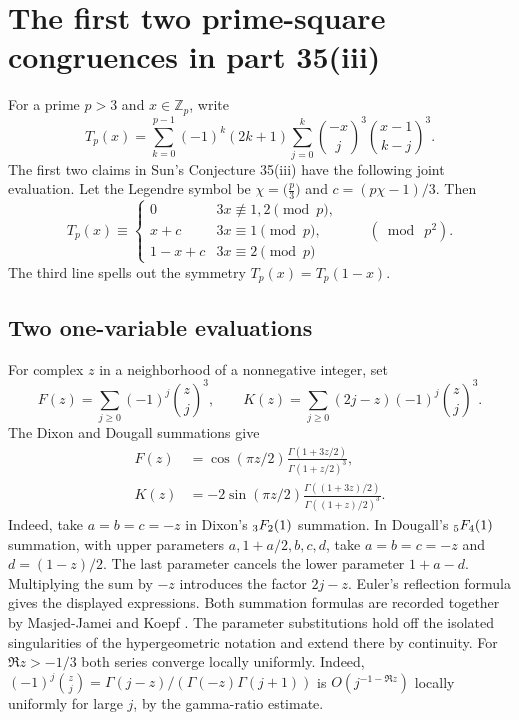 \documentclass[11pt,a4paper]{article}
\theoremstyle{definition}\newtheorem{problem}[theorem]{Auxiliary problem}
\theoremstyle{remark}\newtheorem*{remark}{Remark}
\begin{document}
\section{The first two prime-square congruences in part 35(iii)}
\label{sec:cubicprime}
For a prime $p>3$ and $x\in\mathbb Z_p$, write
\[
 T_p(x)=\sum_{k=0}^{p-1}(-1)^k(2k+1)
        \sum_{j=0}^{k}\binom{-x}{j}^{3}\binom{x-1}{k-j}^{3}.
\]
The first two claims in Sun's Conjecture 35(iii) have the following joint evaluation.
Let the Legendre symbol be $\chi=\bigl(\frac{p}{3}\bigr)$ and $c=(p\chi-1)/3$. Then
\begin{equation}\label{eq:cubic-sun-eval}
 T_p(x)\equiv
 \begin{cases}
   0 & 3x\not\equiv 1,2\pmod p,\\
   x+c & 3x\equiv1\pmod p,\\
   1-x+c & 3x\equiv2\pmod p
 \end{cases}
 \qquad (\bmod\ p^2).
\end{equation}
The third line spells out the symmetry $T_p(x)=T_p(1-x)$.

\subsection*{Two one-variable evaluations}
For complex $z$ in a neighborhood of a nonnegative integer, set
\[
 F(z)=\sum_{j\geq0}(-1)^j\binom zj^3,\qquad
 K(z)=\sum_{j\geq0}(2j-z)(-1)^j\binom zj^3.
\]
The Dixon and Dougall summations give
\begin{align}
 F(z)&=\cos(\pi z/2)\frac{\Gamma(1+3z/2)}{\Gamma(1+z/2)^3},\label{eq:suncubic-dixon}\\
 K(z)&=-2\sin(\pi z/2)\frac{\Gamma((1+3z)/2)}{\Gamma((1+z)/2)^3}.\label{eq:suncubic-dougall}
\end{align}
Indeed, take $a=b=c=-z$ in Dixon's $\mathstrut{}_3F_2(1)$ summation.
In Dougall's $\mathstrut{}_5F_4(1)$ summation, with upper parameters
$a,1+a/2,b,c,d$, take $a=b=c=-z$ and $d=(1-z)/2$.
The last parameter cancels the lower parameter $1+a-d$. Multiplying the sum by $-z$ introduces the factor $2j-z$.
Euler's reflection formula gives the displayed expressions.
Both summation formulas are recorded together by Masjed-Jamei and Koepf
\cite[eqs.~(8), (13)]{masjedkoepf}.
The parameter substitutions hold off the isolated singularities of the hypergeometric notation and extend there by continuity.
For $\Re z>-1/3$ both series converge locally uniformly. Indeed,
$(-1)^j\binom zj=\Gamma(j-z)/(\Gamma(-z)\Gamma(j+1))$ is
$O(j^{-1-\Re z})$ locally uniformly for large $j$, by the gamma-ratio estimate.
\end{document}

